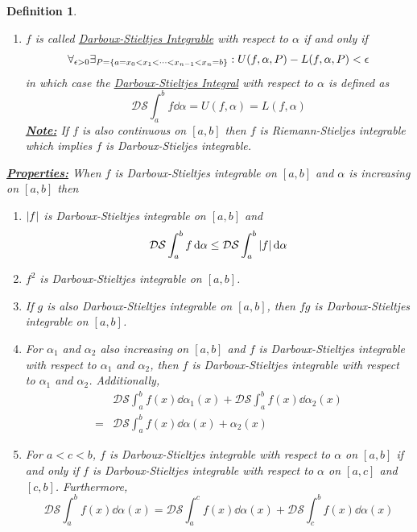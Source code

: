 \documentclass[]{article}
\newtheorem{definition}{Definition}
\begin{document}
\begin{definition}
\begin{enumerate}
        \emph{\textbf{\underline{Note:}}}\[
            L(f, \alpha)
            \leq L(f, \alpha, P) 
            \leq U(f, \alpha, P)
            \leq U(f, \alpha)
        \] for any $P$ partition of $[a,b]$.
        \item $f$ is called \emph{\underline{Darboux-Stieltjes Integrable}} with respect to $\alpha$ if and only if \[
            \forall_{\epsilon>0} \exists_{P = \qty{a = x_0 < x_1 < \cdots < x_{n-1} < x_n = b}} : 
            U(f,\alpha,P) - L(f,\alpha,P) < \epsilon
        \] in which case the \emph{\underline{Darboux-Stieltjes Integral}} with respect to $\alpha$ is defined as \[
            \mathcal{DS} \int_{a}^{b} f \dd{\alpha} = U(f,\alpha) = L(f, \alpha)
        \]
        \emph{\textbf{\underline{Note:}}}
        If $f$ is also continuous on $[a,b]$ then $f$ is Riemann-Stieljes integrable which implies $f$ is Darboux-Stieljes integrable.
    \end{enumerate}
    \textbf{\emph{\underline{Properties:}}}
    When $f$ is Darboux-Stieltjes integrable on $[a,b]$ and $\alpha$ is increasing on $[a,b]$ then
    \begin{enumerate}
        \item $\abs{f}$ is Darboux-Stieltjes integrable on $[a,b]$ and \[
            \mathcal{DS} \int_{a}^{b} f \dd{\alpha} \leq \mathcal{DS} \int_{a}^{b} \abs{f} \dd{\alpha}
        \]
        \item $f^2$ is Darboux-Stieltjes integrable on $[a,b]$.
        \item If $g$ is also Darboux-Stieltjes integrable on $[a,b]$, then $fg$ is Darboux-Stieltjes integrable on $[a,b]$.
        \item For $\alpha_1$ and $\alpha_2$ also increasing on $[a,b]$ and $f$ is Darboux-Stieltjes integrable with respect to $\alpha_1$ and $\alpha_2$, then $f$ is Darboux-Stieltjes integrable with respect to $\alpha_1$ and $\alpha_2$. 
        Additionally, \begin{align*}
            & \mathcal{DS} \int_{a}^{b} f(x) \dd{\alpha_1(x)} + \mathcal{DS} \int_{a}^{b} f(x) \dd{\alpha_2(x)}\\
            = & \mathcal{DS} \int_{a}^{b} f(x) \dd{\alpha(x) + \alpha_2(x)}
        \end{align*}
        \item For $a < c < b$, $f$ is Darboux-Stieltjes integrable with respect to $\alpha$ on $[a,b]$ if and only if $f$ is Darboux-Stieltjes integrable with respect to $\alpha$ on $[a,c]$ and $[c,b]$. 
        Furthermore, \[
            \mathcal{DS} \int_{a}^{b} f(x) \dd{\alpha(x)}
            = \mathcal{DS} \int_{a}^{c} f(x) \dd{\alpha(x)} 
            + \mathcal{DS} \int_{c}^{b} f(x) \dd{\alpha(x)}
        \]
    \end{enumerate}
\end{definition}
\end{document}
